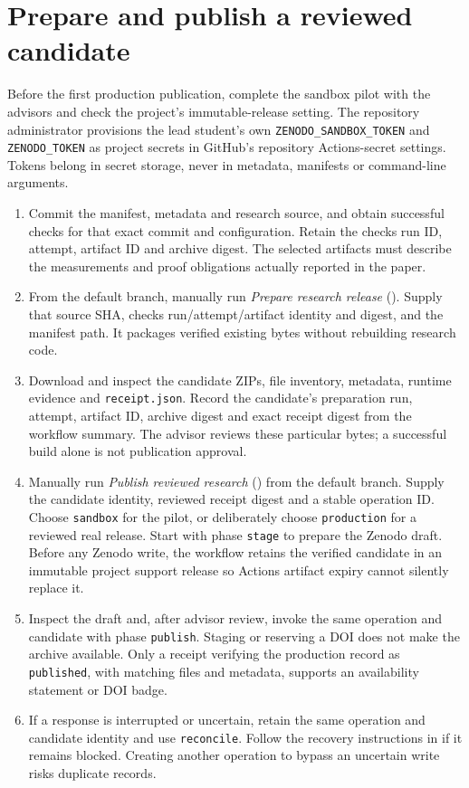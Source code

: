 \section{Prepare and publish a reviewed candidate}
Before the first production publication, complete the sandbox pilot with the advisors and check the project's immutable-release setting. The repository administrator provisions the lead student's own \texttt{ZENODO\_SANDBOX\_TOKEN} and \texttt{ZENODO\_TOKEN} as project secrets in GitHub's repository Actions-secret settings. Tokens belong in secret storage, never in metadata, manifests or command-line arguments.
\begin{enumerate}
  \item Commit the manifest, metadata and research source, and obtain successful checks for that exact commit and configuration. Retain the checks run ID, attempt, artifact ID and archive digest. The selected artifacts must describe the measurements and proof obligations actually reported in the paper.
  \item From the default branch, manually run \emph{Prepare research release} (). Supply that source SHA, checks run/attempt/artifact identity and digest, and the manifest path. It packages verified existing bytes without rebuilding research code.
  \item Download and inspect the candidate ZIPs, file inventory, metadata, runtime evidence and \texttt{receipt.json}. Record the candidate's preparation run, attempt, artifact ID, archive digest and exact receipt digest from the workflow summary. The advisor reviews these particular bytes; a successful build alone is not publication approval.
  \item Manually run \emph{Publish reviewed research} () from the default branch. Supply the candidate identity, reviewed receipt digest and a stable operation ID. Choose \texttt{sandbox} for the pilot, or deliberately choose \texttt{production} for a reviewed real release. Start with phase \texttt{stage} to prepare the Zenodo draft. Before any Zenodo write, the workflow retains the verified candidate in an immutable project support release so Actions artifact expiry cannot silently replace it.
  \item Inspect the draft and, after advisor review, invoke the same operation and candidate with phase \texttt{publish}. Staging or reserving a DOI does not make the archive available. Only a receipt verifying the production record as \texttt{published}, with matching files and metadata, supports an availability statement or DOI badge.
  \item If a response is interrupted or uncertain, retain the same operation and candidate identity and use \texttt{reconcile}. Follow the recovery instructions in  if it remains blocked. Creating another operation to bypass an uncertain write risks duplicate records.
\end{enumerate}
